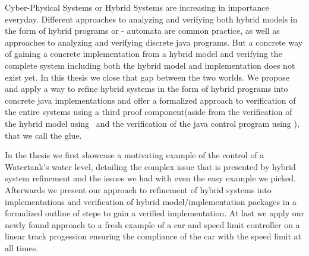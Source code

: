 
\Abstract
Cyber-Physical Systems or Hybrid Systems are increasing in importance everyday. Different approaches to analyzing and verifying both hybrid models in the form of hybrid programs or - automata are common practice, as well as approaches to analyzing and verifying discrete java programs. But a concrete way of gaining a concrete implementation from a hybrid model and verifying the complete system including both the hybrid model and implementation does not exist yet.
In this thesis we close that gap between the two worlds. We propose and apply a way to refine hybrid systems in the form of hybrid programs into concrete java implementations and offer a formalized approach to verification of the entire systems using a third proof component(aside from the verification of the hybrid model using \keym~and the verification of the java control program using \key), that we call the glue. 

In the thesis we first showcase a motivating example of the control of a Watertank's water level, detailing the complex issue that is presented by hybrid system refinement and the issues we had with even the easy example we picked. Afterwards we present our approach to refinement of hybrid systems into implementations and verification of hybrid model/implementation packages in a formalized outline of steps to gain a verified implementation. At last we apply our newly found approach to a fresh example of a car and speed limit controller on a linear track progession ensuring the compliance of the car with the speed limit at all times.